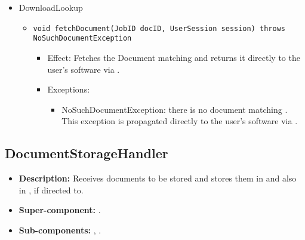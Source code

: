 \begin{itemize}
    \item DownloadLookup
	\begin{itemize}
		\item \texttt{void fetchDocument(JobID docID, UserSession session) throws NoSuchDocumentException}
		\begin{itemize}
			\item Effect: Fetches the Document matching  and returns it directly to the user's software via .
			\item Exceptions:
			\begin{itemize}
				\item NoSuchDocumentException: there is no document matching . This exception is propagated directly to the user's software via .
			\end{itemize}
		\end{itemize}
	\end{itemize}
\end{itemize}

\subsection{DocumentStorageHandler} 
\begin{itemize}
    \item \textbf{Description:} Receives documents to be stored and stores them in  and also in , if directed to.
    \item \textbf{Super-component:} .
    \item \textbf{Sub-components:} , .
\end{itemize}

